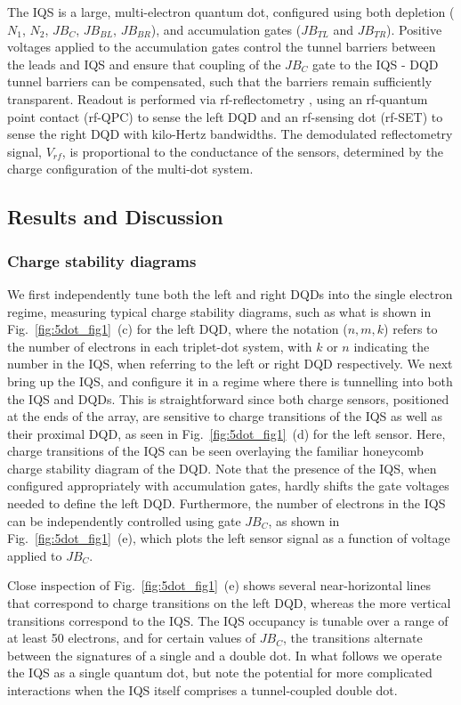 The IQS is a large, multi-electron quantum dot, configured using both depletion ($N_{1}$, $N_{2}$, $JB_{C}$, $JB_{BL}$, $JB_{BR}$), and accumulation gates ($JB_{TL}$ and $JB_{TR}$).  Positive voltages applied to the accumulation gates control the tunnel barriers between the leads and IQS and ensure that coupling of the $JB_{C}$ gate to the IQS - DQD tunnel barriers can be compensated, such that the barriers remain sufficiently transparent. Readout is performed via rf-reflectometry \cite{readoutreilly}, using an rf-quantum point contact (rf-QPC) to sense the left DQD and an rf-sensing dot (rf-SET) to sense the right DQD with kilo-Hertz bandwidths. The demodulated reflectometry signal, $V_{rf}$, is proportional to the conductance of the sensors, determined by the charge configuration of the multi-dot system.

\subsection{Results and Discussion}
\subsubsection{Charge stability diagrams}
We first independently tune both the left and right DQDs into the single electron regime, measuring typical charge stability diagrams, such as what is shown in Fig.~\ref{fig:5dot_fig1}~(c) for the left DQD, where the notation ($n,m,k$) refers to the number of electrons in each triplet-dot system, with $k$ or $n$ indicating the number in the IQS, when referring to the left or right DQD respectively. We next bring up the IQS, and configure it in a regime where there is tunnelling into both the IQS and DQDs. This is straightforward since both charge sensors, positioned at the ends of the array, are sensitive to charge transitions of the IQS as well as their proximal DQD, as seen in Fig.~\ref{fig:5dot_fig1}~(d) for the left sensor. Here, charge transitions of the IQS can be seen overlaying the familiar honeycomb charge stability diagram of the DQD. Note that the presence of the IQS, when configured appropriately with accumulation gates,  hardly shifts the gate voltages needed to define the left DQD. Furthermore, the number of electrons in the IQS can be independently controlled using  gate $JB_{C}$, as shown in Fig.~\ref{fig:5dot_fig1}~(e), which plots the left sensor signal as a function of voltage applied to $JB_{C}$. 

Close inspection of Fig.~\ref{fig:5dot_fig1}~(e) shows several near-horizontal lines that correspond to charge transitions on the left DQD,  whereas the more vertical transitions correspond to the IQS. The IQS occupancy is tunable over a range of at least 50 electrons, and for certain values of $JB_{C}$, the transitions alternate between the signatures of a single and a double dot. In what follows we operate the IQS as a single quantum dot, but note the potential for more complicated interactions when the IQS itself comprises a tunnel-coupled double dot. 
 
